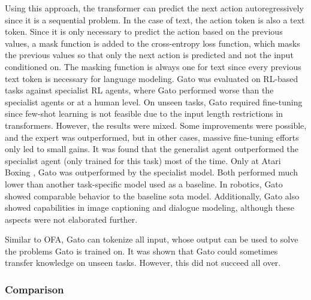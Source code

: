 \documentclass[
]{krantz}
\begin{document}
Using this approach, the transformer can predict the next action autoregressively since it is a sequential problem. In the case of text, the action token is also a text token. Since it is only necessary to predict the action based on the previous values, a mask function is added to the cross-entropy loss function, which masks the previous values so that only the next action is predicted and not the input conditioned on. The masking function is always one for text since every previous text token is necessary for language modeling.
Gato was evaluated on RL-based tasks against specialist RL agents, where Gato performed worse than the specialist agents or at a human level. On unseen tasks, Gato required fine-tuning since few-shot learning is not feasible due to the input length restrictions in transformers. However, the results were mixed. Some improvements were possible, and the expert was outperformed, but in other cases, massive fine-tuning efforts only led to small gains. It was found that the generalist agent outperformed the specialist agent (only trained for this task) most of the time. Only at Atari Boxing \citep{atari}, Gato was outperformed by the specialist model. Both performed much lower than another task-specific model used as a baseline. In robotics, Gato showed comparable behavior to the baseline sota model. Additionally, Gato also showed capabilities in image captioning and dialogue modeling, although these aspects were not elaborated further.

Similar to OFA, Gato can tokenize all input, whose output can be used to solve the problems Gato is trained on. It was shown that Gato could sometimes transfer knowledge on unseen tasks. However, this did not succeed all over.

\hypertarget{comparison}{%
\subsubsection{Comparison}\label{comparison}}
\end{document}
